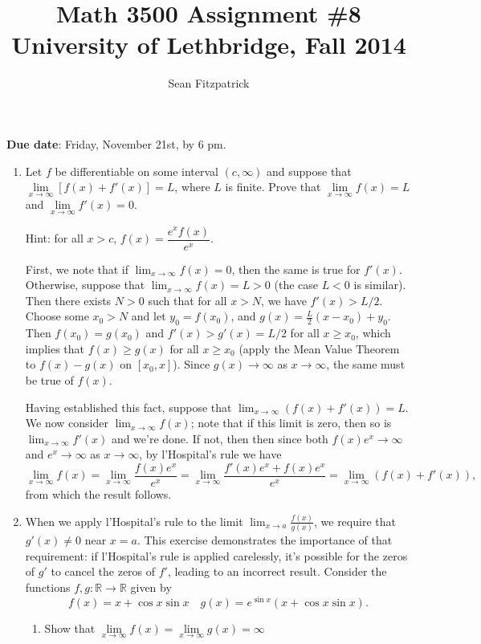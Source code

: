 \documentclass[letterpaper,12pt]{article}
\title{Math 3500 Assignment \#8\\University of Lethbridge, Fall 2014}
\author{Sean Fitzpatrick}
\newcommand{\R}{\mathbb{R}}
\begin{document}
 \maketitle


{\bf Due date}: Friday, November 21st, by 6 pm.


\begin{enumerate}
 \item Let $f$ be differentiable on some interval $(c,\infty)$ and suppose that $\lim\limits_{x\to\infty}[f(x)+f'(x)]=L$, where $L$ is finite. Prove that $\lim\limits_{x\to\infty}f(x)=L$ and $\lim\limits_{x\to\infty}f'(x)=0$.

Hint: for all $x>c$, $f(x)=\dfrac{e^xf(x)}{e^x}$.

\bigskip

First, we note that if $\lim_{x\to\infty}f(x)=0$, then the same is true for $f'(x)$. Otherwise, suppose that $\lim_{x\to\infty}f(x)=L>0$ (the case $L<0$ is similar). Then there exists $N>0$ such that for all $x>N$, we have $f'(x)>L/2$. Choose some $x_0>N$ and let $y_0=f(x_0)$, and $g(x) = \frac{L}{2}(x-x_0)+y_0$. Then $f(x_0)=g(x_0)$ and $f'(x)>g'(x)=L/2$ for all $x\geq x_0$, which implies that $f(x)\geq g(x)$ for all $x\geq x_0$ (apply the Mean Value Theorem to $f(x)-g(x)$ on $[x_0,x]$). Since $g(x)\to\infty$ as $x\to \infty$, the same must be true of $f(x)$.

Having established this fact, suppose that $\lim_{x\to \infty}(f(x)+f'(x))=L$. We now consider $\lim_{x\to\infty}f(x)$; note that if this limit is zero, then so is $\lim_{x\to\infty}f'(x)$ and we're done. If not, then then since both $f(x)e^x\to \infty$ and $e^x\to \infty$ as $x\to \infty$, by l'Hospital's rule we have
\[
\lim_{x\to\infty}f(x) = \lim_{x\to\infty}\frac{f(x)e^x}{e^x} = \lim_{x\to\infty}\frac{f'(x)e^x+f(x)e^x}{e^x} = \lim_{x\to\infty}(f(x)+f'(x)),
\]
from which the result follows.

\bigskip

 \item When we apply l'Hospital's rule to the limit $\displaystyle \lim_{x\to a}\frac{f(x)}{g(x)}$, we require that $g'(x)\neq 0$ near $x=a$. This exercise demonstrates the importance of that requirement: if l'Hospital's rule is applied carelessly, it's possible for the zeros of $g'$ to cancel the zeros of $f'$, leading to an incorrect result. Consider the functions $f,g:\R\to\R$ given by
\[
 f(x)=x+\cos x\sin x \quad g(x) =e^{\sin x}(x+\cos x\sin x).
\]
\begin{enumerate}
 \item Show that $\lim\limits_{x\to\infty}f(x)=\lim\limits_{x\to\infty}g(x)=\infty$
 

\end{enumerate}
\end{enumerate}
\end{document}
